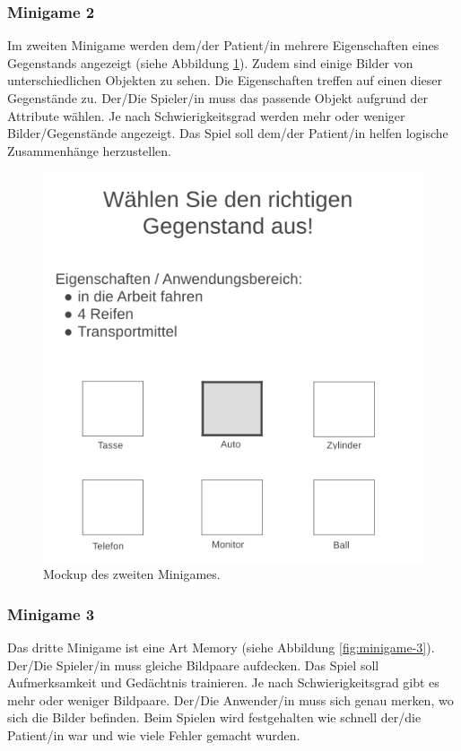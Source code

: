 \subsubsection{Minigame 2}
Im zweiten Minigame werden dem/der Patient/in mehrere Eigenschaften eines Gegenstands angezeigt (siehe Abbildung \ref{fig:minigame-2}). Zudem sind einige Bilder von unterschiedlichen Objekten zu sehen. Die Eigenschaften treffen auf einen dieser Gegenstände zu. Der/Die Spieler/in muss das passende Objekt aufgrund der Attribute wählen. Je nach Schwierigkeitsgrad werden mehr oder weniger Bilder/Gegenstände angezeigt. Das Spiel soll dem/der Patient/in helfen logische Zusammenhänge herzustellen.

\begin{figure}[H]
    \centering
	\includegraphics[width=0.6\linewidth]{figures/development/minigame/minigame-2.png}
	\caption{Mockup des zweiten Minigames.}
	\label{fig:minigame-2}
\end{figure}

\subsubsection{Minigame 3}
Das dritte Minigame ist eine Art Memory (siehe Abbildung \ref{fig:minigame-3}). Der/Die Spieler/in muss gleiche Bildpaare aufdecken. Das Spiel soll Aufmerksamkeit und Gedächtnis trainieren. Je nach Schwierigkeitsgrad gibt es mehr oder weniger Bildpaare. Der/Die Anwender/in muss sich genau merken, wo sich die Bilder befinden. Beim Spielen wird festgehalten wie schnell der/die Patient/in war und wie viele Fehler gemacht wurden.

